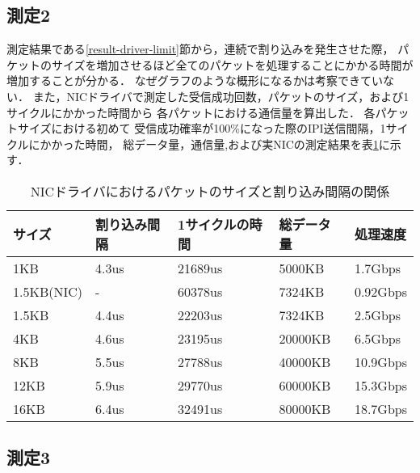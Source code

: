 \documentclass[12pt]{jsarticle}
\begin{document}
\subsection{測定2}

測定結果である\ref{result-driver-limit}節から，連続で割り込みを発生させた際，
パケットのサイズを増加させるほど全てのパケットを処理することにかかる時間が増加することが分かる．
なぜグラフのような概形になるかは考察できていない．
また，NICドライバで測定した受信成功回数，パケットのサイズ，および1サイクルにかかった時間から
各パケットにおける通信量を算出した．
各パケットサイズにおける初めて
受信成功確率が100\%になった際のIPI送信間隔，1サイクルにかかった時間，
総データ量，通信量,および実NICの測定結果を表\ref{table:driver}に示す．
\begin{table}[h]
    \caption{NICドライバにおけるパケットのサイズと割り込み間隔の関係}
    \label{table:driver}
    \begin{center}
        \begin{tabular}{l|l|l|l|l}   \hline \hline 
            サイズ   & 割り込み間隔      & 1サイクルの時間      & 総データ量   & 処理速度       \\ \hline
            1KB      & 4.3us            & 21689us              & 5000KB       & 1.7Gbps            \\ 
            1.5KB(NIC)& -               & 60378us              & 7324KB       & 0.92Gbps           \\
            1.5KB    & 4.4us            & 22203us              & 7324KB       & 2.5Gbps            \\ 
            4KB      & 4.6us            & 23195us              & 20000KB      & 6.5Gbps            \\ 
            8KB      & 5.5us            & 27788us              & 40000KB      & 10.9Gbps           \\ 
            12KB     & 5.9us            & 29770us              & 60000KB      & 15.3Gbps           \\ 
            16KB     & 6.4us            & 32491us              & 80000KB      & 18.7Gbps           \\ \hline
        \end{tabular}
    \end{center}
\end{table}

\subsection{測定3}
\end{document}
